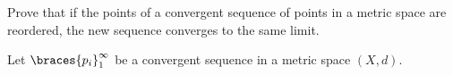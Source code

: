 \begin{problem}
  Prove that if the points of a convergent sequence of points in a metric space
  are reordered, the new sequence converges to the same limit.
\end{problem}

\begin{answer}
  Let $\braces{p_i}_1^\infty$ be a convergent sequence in a metric space $(X, d)$.
\end{answer}
